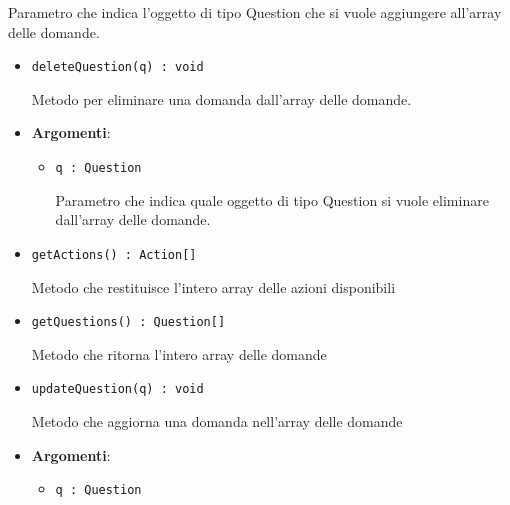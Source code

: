 \documentclass[../DefinizioneDiProdotto.tex]{subfiles}
\begin{document}
\begin{itemize}
\begin{itemize}
\begin{itemize}
\begin{itemize}
	 Parametro che indica l'oggetto di tipo Question che si vuole aggiungere all'array delle domande.
	\end{itemize}
	\end{itemize}\vspace{0.5em}
	\begin{itemize}
	\item \texttt{deleteQuestion(q) : void}\

	 Metodo per eliminare una domanda dall'array delle domande.

	\item \textbf{Argomenti}:
	\begin{itemize}
	\item \texttt{q : Question}\

	 Parametro che indica quale oggetto di tipo Question si vuole eliminare dall'array delle domande.
	\end{itemize}
	\end{itemize}\vspace{0.5em}
	\begin{itemize}
	\item \texttt{getActions() : Action[]}\

	 Metodo che restituisce l'intero array delle azioni disponibili
	\end{itemize}\vspace{0.5em}
	\begin{itemize}
	\item \texttt{getQuestions() : Question[]}\

	 Metodo che ritorna l'intero array delle domande
	\end{itemize}\vspace{0.5em}
	\begin{itemize}
	\item \texttt{updateQuestion(q) : void}\

	 Metodo che aggiorna una domanda nell'array delle domande

	\item \textbf{Argomenti}:
	\begin{itemize}
	\item \texttt{q : Question}\


\end{itemize}
\end{itemize}
\end{itemize}
\end{itemize}
\end{document}

